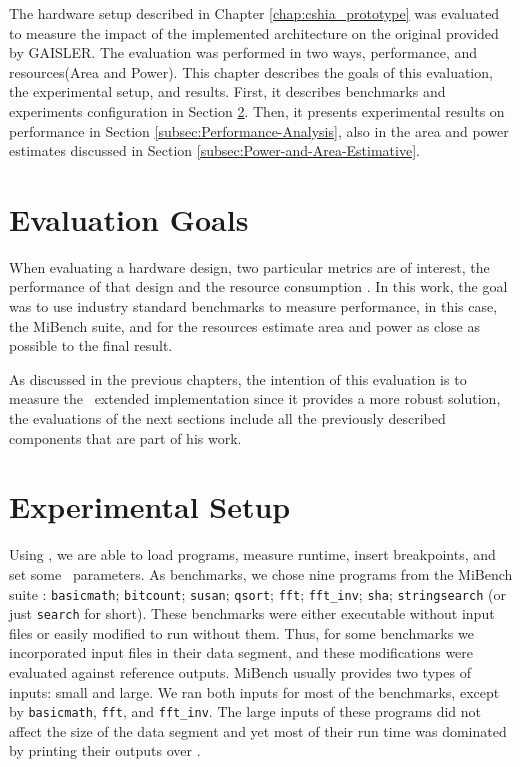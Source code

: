


The hardware setup described in Chapter \ref{chap:cshia_prototype} was evaluated to measure the impact of the implemented architecture on the original provided by GAISLER. The evaluation was performed in two ways,  performance, and resources(Area and Power).  
This chapter describes the goals of this evaluation, the experimental setup, and results. First, it describes benchmarks and experiments configuration in Section 
\ref{subsec:Experimental-Setup}. Then, it presents experimental results on performance in Section \ref{subsec:Performance-Analysis}, also in the area and power estimates discussed in Section \ref{subsec:Power-and-Area-Estimative}.

\section{Evaluation Goals}
\label{sec:evalgoals}
When evaluating a hardware design, two particular metrics are of interest, the performance of that design and the resource consumption \cite{WolfHardSoft}.  In this work, the goal was to use industry standard benchmarks to measure performance, in this case, the MiBench suite, and for the resources estimate area and power as close as possible to the final result. 

As discussed in the previous chapters, the intention of this evaluation is to measure the \cshia~extended implementation since it provides a more robust solution, the evaluations of the next sections include all the previously described components that are part of his work.  


\section{Experimental Setup}
\label{subsec:Experimental-Setup}

Using \grmon, we are able to load programs, measure runtime, insert breakpoints, and set some \leon~parameters. As benchmarks, we chose nine programs from the MiBench suite \cite{MiBench}: \texttt{basicmath}; \texttt{bitcount}; \texttt{susan}; \texttt{qsort}; \texttt{fft}; \texttt{fft\_inv}; \texttt{sha}; \texttt{stringsearch} (or just \texttt{search} for short). These benchmarks were either executable without input files or easily modified to run without them. Thus, for some benchmarks we incorporated input files in their data segment, and these modifications were evaluated against reference outputs. MiBench usually provides two types of inputs: small and large. We ran both inputs for most of the benchmarks, except by \texttt{basicmath}, \texttt{fft}, and \texttt{fft\_inv}. The large inputs of these programs did not affect the size of the data segment and yet most of their run time was dominated by printing their outputs over \grmon.

